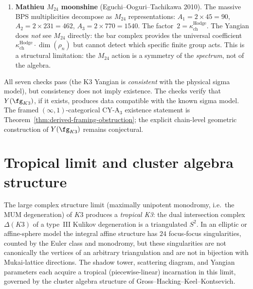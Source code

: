 \begin{enumerate}
\item \textbf{Mathieu $M_{24}$ moonshine} (Eguchi--Ooguri--Tachikawa 2010).
 The massive BPS multiplicities decompose as $M_{24}$ representations:
 $A_1 = 2 \times 45 = 90$, $A_2 = 2 \times 231 = 462$,
 $A_3 = 2 \times 770 = 1540$. The factor~$2 = \kappa_{\mathrm{ch}}^{\mathrm{Hodge}}$.
 The Yangian does \emph{not} see $M_{24}$ directly: the bar complex
 provides the universal coefficient $\kappa_{\mathrm{ch}}^{\mathrm{Hodge}} \cdot
 \dim(\rho_n)$ but cannot detect which specific finite group acts.
 This is a structural limitation: the $M_{24}$ action is a symmetry
 of the \emph{spectrum}, not of the algebra.
\end{enumerate}

\begin{remark}
\label{rem:sigma-model-consistency-caveat}
All seven checks pass (the K3 Yangian is \emph{consistent} with the
physical sigma model), but consistency does not imply existence.
The checks verify that $Y(\fg_{K3})$, if it exists, produces data
compatible with the known sigma model. The framed \((\infty,1)\)-categorical
CY-A$_3$ existence statement is Theorem~\ref{thm:derived-framing-obstruction};
the explicit chain-level geometric construction of $Y(\fg_{K3})$
remains conjectural.
\end{remark}


\section{Tropical limit and cluster algebra structure}
\label{sec:k3e-tropical}

The large complex structure limit (maximally unipotent monodromy, i.e.\
the MUM degeneration) of \(K3\) produces a \emph{tropical K3}: the dual
intersection complex \(\Delta(K3)\) of a type~III Kulikov degeneration
is a triangulated \(S^2\).  In an elliptic or affine-sphere model the
integral affine structure has \(24\) focus-focus singularities, counted
by the Euler class and monodromy, but these singularities are not
canonically the vertices of an arbitrary triangulation and are not in
bijection with Mukai-lattice directions. The shadow tower, scattering
diagram, and Yangian parameters each acquire a tropical
(piecewise-linear) incarnation in this limit, governed by the cluster
algebra structure of Gross--Hacking--Keel--Kontsevich.


